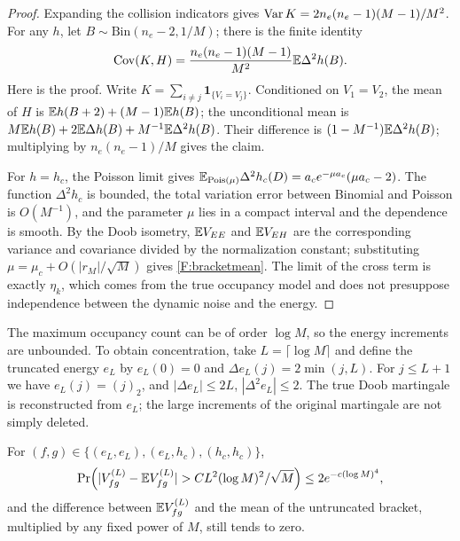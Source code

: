\begin{proof}
Expanding the collision indicators gives $\operatorname{Var} K=2n_e(n_e-1)(M-1)/M^2$. For any $h$, let
$B\sim\mathrm{Bin}(n_e-2,1/M)$; there is the finite identity
\begin{equation*}
\operatorname{Cov}(K,H)=\frac{n_e(n_e-1)(M-1)}{M^2}\mathbb E\Delta^2h(B).
\end{equation*}
Here is the proof. Write $K=\sum_{i\ne j}\mathbf1_{\{V_i=V_j\}}$. Conditioned on $V_1=V_2$, the
mean of $H$ is $\mathbb E h(B+2)+(M-1)\mathbb E h(B)$; the unconditional mean is
$M\mathbb E h(B)+2\mathbb E\Delta h(B)+M^{-1}\mathbb E\Delta^2h(B)$. Their difference is
$(1-M^{-1})\mathbb E\Delta^2h(B)$; multiplying by $n_e(n_e-1)/M$ gives the claim.

For $h=h_c$, the Poisson limit gives
$\mathbb E_{\operatorname{Pois}(\mu)}\Delta^2h_c(D)=a_ce^{-\mu a_c}(\mu a_c-2)$. The function $\Delta^2h_c$ is
bounded, the total variation error between Binomial and Poisson is $O(M^{-1})$, and the parameter
$\mu$ lies in a compact interval and the dependence is smooth. By the Doob isometry, $\mathbb E V_{EE}$
and $\mathbb E V_{EH}$ are the corresponding variance and covariance divided by the normalization
constant; substituting $\mu=\mu_c+O(|r_M|/\sqrt M)$ gives \eqref{F:bracketmean}. The limit of the
cross term is exactly $\eta_k$, which comes from the true occupancy model and does not presuppose
independence between the dynamic noise and the energy.
\end{proof}

The maximum occupancy count can be of order $\log M$, so the energy increments are unbounded. To
obtain concentration, take $L=\lceil\log M\rceil$ and define the truncated energy $e_L$ by
$e_L(0)=0$ and $\Delta e_L(j)=2\min(j,L)$. For $j\le L+1$ we have $e_L(j)=(j)_2$, and
$|\Delta e_L|\le2L$, $|\Delta^2e_L|\le2$. The true Doob martingale is reconstructed from $e_L$;
the large increments of the original martingale are not simply deleted.

\begin{lemma}\label{F:lem:conc}
For $(f,g)\in\{(e_L,e_L),(e_L,h_c),(h_c,h_c)\}$,
\begin{equation}
\Pr\Bigl(|V^{(L)}_{fg}-\E V^{(L)}_{fg}|>CL^2(\log M)^2/\sqrt M\Bigr)\le2e^{-c(\log M)^4},\label{F:conc}
\end{equation}
and the difference between $\mathbb E V^{(L)}_{fg}$ and the mean of the untruncated bracket, multiplied
by any fixed power of $M$, still tends to zero.
\end{lemma}


